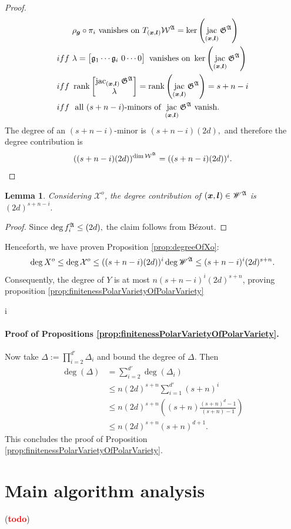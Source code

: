 \documentclass[12pt]{article}
\DeclareMathOperator{\jac}{jac}
\DeclareMathOperator{\rank}{rank}
\def\td{(\textcolor{red}{{\bf todo}})}
\newtheorem{lemma}[theorem]{Lemma}
\def\td{(\textcolor{red}{{\bf todo}})}
\begin{document}
\begin{proof}
%
\begin{align*}
    &\rho_{\bm g} \circ \pi_i \textrm{ vanishes on } T_{(\bm x,\bm l)}\mathcal{W}^{\frak{A}} = \ker \left(\jac_{(\bm x, \bm l)} \frak{G}^\frak{A} \right)\\
    iff~& \lambda = 
\begin{bmatrix}
\frak{g}_1 \cdots \frak{g}_i ~0 \cdots 0
\end{bmatrix} \textrm{ vanishes on }\ker \left(\jac_{(\bm x, \bm l)} \frak{G}^\frak{A} \right)\\
    iff~&
    \rank 
    \begin{bmatrix}
    \jac_{(\bm x, \bm l)} \frak{G}^\frak{A}\\
    \lambda 
    \end{bmatrix}
    =\rank \left( \jac_{(\bm x, \bm l)} \frak{G}^{\frak{A}}\right) =s+n-i\\  
    iff~& \textrm{ all }(s + n-i)\textrm{-minors of }\jac_{(\bm x, \bm l)} \frak{G}^\frak{A} \textrm{ vanish.}
\end{align*}
%
The degree of an $(s + n-i)$-minor is $(s + n-i)(2d),$ and therefore the degree contribution is
\[
((s + n-i)(2d))^{\dim \mathcal{W}^{\frak{A}}}
=
((s + n-i)(2d))^i.
\]
\end{proof}
%
%
\begin{lemma} 
Considering $\mathcal{X}^o$, the degree contribution of $(\bm x, \bm l) \in \mathscr{W}^{\frak{A}}$ is $(2d)^{s+n-i}.$
\end{lemma}
%
%
\begin{proof}
Since $\deg f_i^{\frak{A}} \leq (2d),$ the claim follows from B\'ezout.
\end{proof}
%
\noindent 
Henceforth, we have proven Proposition \ref{prop:degreeOfXo}: \[\deg X^o \leq \deg \mathcal{X}^o \leq ((s + n-i)(2d))^i \deg \mathscr{W}^{\frak{A}} \leq (s+n-i)^i(2d)^{s+n}.\]
Consequently, the degree of $Y$ is at most $n(s+n-i)^i(2d)^{s+n}$, proving proposition \ref{prop:finitenessPolarVarietyOfPolarVariety}




i
\paragraph*{Proof of Propositions \ref{prop:finitenessPolarVarietyOfPolarVariety}.}
Now take $\Delta := \prod_{i=2}^{d'}\Delta_i$ and bound the degree of $\Delta.$ Then
\begin{align*}
    \deg(\Delta) &= \sum_{i=2}^{d'} \deg (\Delta_i)\\
    &\leq n(2d)^{s+n}\sum_{i=1}^{d'} (s+n)^i\\
    &\leq n(2d)^{s+n}\left((s+n)\frac{(s+n)^d-1}{(s+n)-1}\right)\\
    &\leq n(2d)^{s+n}(s+n)^{d+1}.
\end{align*}
This concludes the proof of Proposition \ref{prop:finitenessPolarVarietyOfPolarVariety}. 



\section{Main algorithm analysis}
\td 






\end{document}
